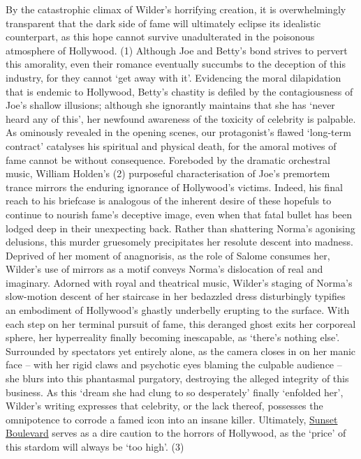\documentclass[a4paper]{article}
\begin{document}
By the catastrophic climax of Wilder’s horrifying creation, it is overwhelmingly transparent that the dark side of fame will ultimately eclipse its idealistic counterpart, as this hope cannot survive unadulterated in the poisonous atmosphere of Hollywood. (1) Although Joe and Betty’s bond strives to pervert this amorality, even their romance eventually succumbs to the deception of this industry, for they cannot ‘get away with it’. Evidencing the moral dilapidation that is endemic to Hollywood, Betty’s chastity is defiled by the contagiousness of Joe’s shallow illusions; although she ignorantly maintains that she has ‘never heard any of this’, her newfound awareness of the toxicity of celebrity is palpable. As ominously revealed in the opening scenes, our protagonist’s flawed ‘long-term contract’ catalyses his spiritual and physical death, for the amoral motives of fame cannot be without consequence. Foreboded by the dramatic orchestral music, William Holden’s (2) purposeful characterisation of Joe’s premortem trance mirrors the enduring ignorance of Hollywood’s victims. Indeed, his final reach to his briefcase is analogous of the inherent desire of these hopefuls to continue to nourish fame’s deceptive image, even when that fatal bullet has been lodged deep in their unexpecting back. Rather than shattering Norma’s agonising delusions, this murder gruesomely precipitates her resolute descent into madness. Deprived of her moment of anagnorisis, as the role of Salome consumes her, Wilder’s use of mirrors as a motif conveys Norma’s dislocation of real and imaginary. Adorned with royal and theatrical music, Wilder’s staging of Norma’s slow-motion descent of her staircase in her bedazzled dress disturbingly typifies an embodiment of Hollywood’s ghastly underbelly erupting to the surface. With each step on her terminal pursuit of fame, this deranged ghost exits her corporeal sphere, her hyperreality finally becoming inescapable, as ‘there’s nothing else’. Surrounded by spectators yet entirely alone, as the camera closes in on her manic face – with her rigid claws and psychotic eyes blaming the culpable audience – she blurs into this phantasmal purgatory, destroying the alleged integrity of this business. As this ‘dream she had clung to so desperately’ finally ‘enfolded her’, Wilder’s writing expresses that celebrity, or the lack thereof, possesses the omnipotence to corrode a famed icon into an insane killer. Ultimately, \underline{Sunset Boulevard} serves as a dire caution to the horrors of Hollywood, as the ‘price’ of this stardom will always be ‘too high’. (3)\\
\end{document}
